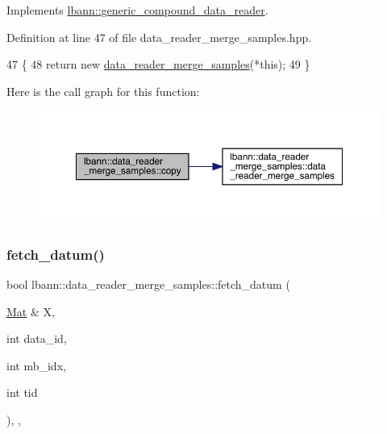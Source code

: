 Implements \hyperlink{classlbann_1_1generic__compound__data__reader_a197f5fd06679f777a709453830fcc4f9}{lbann\+::generic\+\_\+compound\+\_\+data\+\_\+reader}.



Definition at line 47 of file data\+\_\+reader\+\_\+merge\+\_\+samples.\+hpp.


\begin{DoxyCode}
47                                                    \{
48     \textcolor{keywordflow}{return} \textcolor{keyword}{new} \hyperlink{classlbann_1_1data__reader__merge__samples_a01ff9ff7827030da41f1f6d257551260}{data\_reader\_merge\_samples}(*\textcolor{keyword}{this});
49   \}
\end{DoxyCode}
Here is the call graph for this function\+:\nopagebreak
\begin{figure}[H]
\begin{center}
\leavevmode
\includegraphics[width=350pt]{classlbann_1_1data__reader__merge__samples_ae22e720cfc9c6a196a04b7b65472618e_cgraph}
\end{center}
\end{figure}
\mbox{\label{classlbann_1_1data__reader__merge__samples_a413a54d7ccac03bfacdf63cf871fd378}} 
\subsubsection{\texorpdfstring{fetch\+\_\+datum()}{fetch\_datum()}}
{\footnotesize\ttfamily bool lbann\+::data\+\_\+reader\+\_\+merge\+\_\+samples\+::fetch\+\_\+datum (\begin{DoxyParamCaption}\item[{\hyperlink{base_8hpp_a68f11fdc31b62516cb310831bbe54d73}{Mat} \&}]{X,  }\item[{int}]{data\+\_\+id,  }\item[{int}]{mb\+\_\+idx,  }\item[{int}]{tid }\end{DoxyParamCaption})\hspace{0.3cm}{\ttfamily [override]}, {\ttfamily [protected]}, {\ttfamily [virtual]}}


